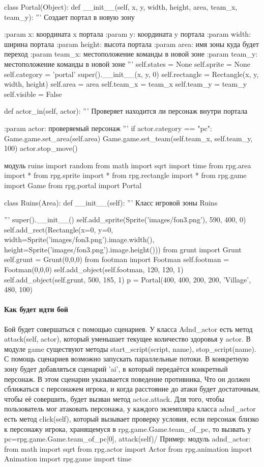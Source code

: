 class Portal(Object):
def \_\_init\_\_(self, x, y, width, height, area, team\_x, team\_y):
''' 
Создает портал в новую зону

:param x: координата x портала
:param y: координата y портала
:param width: ширина портала
:param height: высота портала
:param area: имя зоны куда будет переход
:param team\_x: местоположение команды в новой зоне
:param team\_y: местоположение команды в новой зоне
'''
self.states = None
self.sprite = None
self.category = 'portal'
super().\_\_init\_\_(x, y, 0)
self.rectangle = Rectangle(x, y, width, height)
self.area = area
self.team\_x = team\_x
self.team\_y = team\_y
self.visible = False

def actor\_in(self, actor):
'''
Проверяет находится ли персонаж внутри портала

:param actor: проверяемый персонаж
'''
if actor.category == "pc":
Game.game.set\_area(self.area)
Game.game.set\_team(self.team\_x, self.team\_y, 100)
actor.stop\_move()

модуль ruins
import random
from math import sqrt
import time
from rpg.area import *
from rpg.sprite import *
from rpg.rectangle import *
from rpg.game import Game
from rpg.portal import Portal

class Ruins(Area):
def \_\_init\_\_(self):
'''
Класс игровой зоны Ruins

'''
super().\_\_init\_\_()
self.add\_sprite(Sprite('images/fon3.png'), 590, 400, 0)
self.add\_rect(Rectangle(x=0, y=0, width=Sprite('images/fon3.png').image.width(), height=Sprite('images/fon3.png').image.height()))
from grunt import Grunt
self.grunt = Grunt(0,0,0)
from footman import Footman
self.footman = Footman(0,0,0)
self.add\_object(self.footman, 120, 120, 1)
self.add\_object(self.grunt, 500, 185, 1)
p = Portal(400, 400, 200, 200, 'Village', 480, 100)

\paragraph{Как будет идти бой}
Бой будет совершаться с помощью сценариев. У класса Adnd\_actor есть метод attack(self, actor), который уменьшает текущее количество здоровья у actor. В модуле game существуют методы start\_script(script, name), stop\_script(name). С помощь сценариев возможно запускать параллельные потоки. В конкретную зону будет добавляться сценарий 'ai', в который передаётся конкретный персонаж. В этом сценарии указывается поведение противника, Что он должен сближаться с персонажем игрока, и когда расстояние до атаки будет достаточным, чтобы её совершить, будет вызван метод actor.attack. Для того, чтобы пользователь мог атаковать персонажа, у каждого экземпляра класса adnd\_actor есть метод click(self), который вызывает проверку условия, если персонаж близко к персонажу игрока, хранящемуся в rpg.game.Game.team\_of\_pc, то вызвать у pc=rpg.game.Game.team\_of\_pc[0], attack(self)/
Пример:
модуль adnd\_actor:
from math import sqrt
from rpg.actor import Actor
from rpg.animation import Animation
import rpg.game
import time

